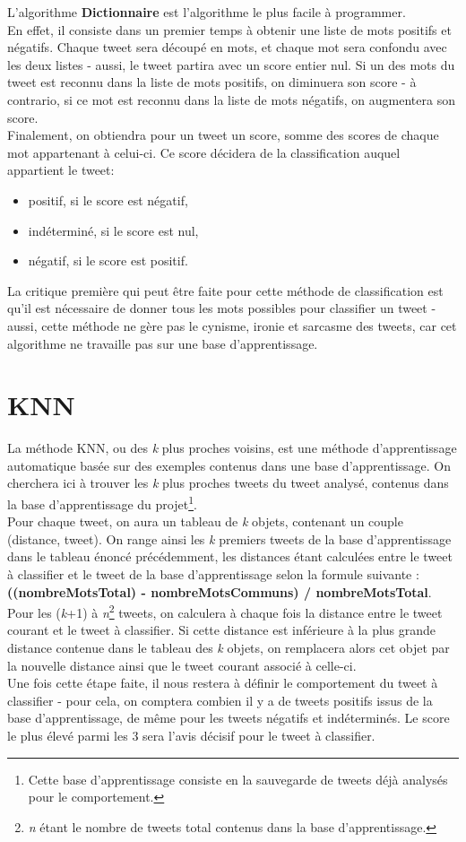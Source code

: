 \documentclass[pdftex,12pt,a4paper]{report}
\begin{document}
\begin{spacing}{1.2}
L'algorithme \textbf{Dictionnaire} est l'algorithme le plus facile à programmer.\\
En effet, il consiste dans un premier temps à obtenir une liste de mots positifs et négatifs. Chaque tweet sera découpé en mots, et chaque mot sera confondu avec les deux listes - aussi, le tweet partira avec un score entier nul. Si un des mots du tweet est reconnu dans la liste de mots positifs, on diminuera son score - à contrario, si ce mot est reconnu dans la liste de mots négatifs, on augmentera son score.\\
Finalement, on obtiendra pour un tweet un score, somme des scores de chaque mot appartenant à celui-ci. Ce score décidera de la classification auquel appartient le tweet:
\begin{itemize}
\item{positif, si le score est négatif,}
\item{indéterminé, si le score est nul,}
\item{négatif, si le score est positif.}
\end{itemize}
La critique première qui peut être faite pour cette méthode de classification est qu'il est nécessaire de donner tous les mots possibles pour classifier un tweet - aussi, cette méthode ne gère pas le cynisme, ironie et sarcasme des tweets, car cet algorithme ne travaille pas sur une base d'apprentissage.

\section{KNN}

La méthode KNN, ou des \textit{k} plus proches voisins, est une méthode d'apprentissage automatique basée sur des exemples contenus dans une base d'apprentissage.
On cherchera ici à trouver les \textit{k} plus proches tweets du tweet analysé, contenus dans la base d'apprentissage du projet\footnote{Cette base d'apprentissage consiste en la sauvegarde de tweets déjà analysés pour le comportement.}.
\\
Pour chaque tweet, on aura un tableau de \textit{k} objets, contenant un couple (distance, tweet). On range ainsi les \textit{k} premiers tweets de la base d'apprentissage dans le tableau énoncé précédemment, les distances étant calculées entre le tweet à classifier et le tweet de la base d'apprentissage selon la formule suivante : \textbf{((nombreMotsTotal) - nombreMotsCommuns) / nombreMotsTotal}.
Pour les (\textit{k}+1) à \textit{n}\footnote{\textit{n} étant le nombre de tweets total contenus dans la base d'apprentissage.} tweets, on calculera à chaque fois la distance entre le tweet courant et le tweet à classifier. Si cette distance est inférieure à la plus grande distance contenue dans le tableau des \textit{k} objets, on remplacera alors cet objet par la nouvelle distance ainsi que le tweet courant associé à celle-ci.
\\
Une fois cette étape faite, il nous restera à définir le comportement du tweet à classifier - pour cela, on comptera combien il y a de tweets positifs issus de la base d'apprentissage, de même pour les tweets négatifs et indéterminés. Le score le plus élevé parmi les 3 sera l'avis décisif pour le tweet à classifier.


\end{spacing}
\end{document}
